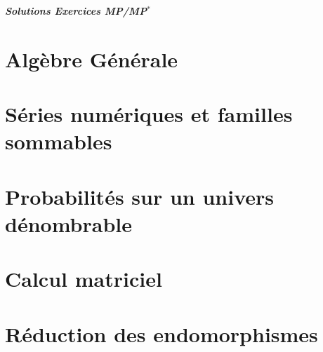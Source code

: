 \documentclass[12pt]{article}
\theoremstyle{remark}
\numberwithin{equation}{section}
\begin{document}
\begin{titlepage}
	\centering
	\vspace*{\fill}
	\Huge \textit{\textbf{Solutions Exercices MP/MP$^*$}}
	\vspace*{\fill}
\end{titlepage}

\cleardoublepage

\tableofcontents

\cleardoublepage

\section{Algèbre Générale}
\cleardoublepage
\section{Séries numériques et familles sommables}
\cleardoublepage
\section{Probabilités sur un univers dénombrable}
\cleardoublepage
\section{Calcul matriciel}
\cleardoublepage
\section{Réduction des endomorphismes}
\end{document}
